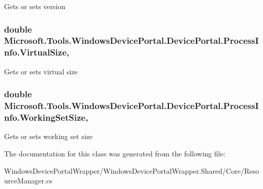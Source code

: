 Gets or sets version 

\subsubsection[{\texorpdfstring{Virtual\+Size}{VirtualSize}}]{\setlength{\rightskip}{0pt plus 5cm}double Microsoft.\+Tools.\+Windows\+Device\+Portal.\+Device\+Portal.\+Process\+Info.\+Virtual\+Size\hspace{0.3cm}{\ttfamily [get]}, {\ttfamily [set]}}\hypertarget{class_microsoft_1_1_tools_1_1_windows_device_portal_1_1_device_portal_1_1_process_info_aec3d7ee9312e1ac9a688131f11de9f89}{}\label{class_microsoft_1_1_tools_1_1_windows_device_portal_1_1_device_portal_1_1_process_info_aec3d7ee9312e1ac9a688131f11de9f89}


Gets or sets virtual size 

\subsubsection[{\texorpdfstring{Working\+Set\+Size}{WorkingSetSize}}]{\setlength{\rightskip}{0pt plus 5cm}double Microsoft.\+Tools.\+Windows\+Device\+Portal.\+Device\+Portal.\+Process\+Info.\+Working\+Set\+Size\hspace{0.3cm}{\ttfamily [get]}, {\ttfamily [set]}}\hypertarget{class_microsoft_1_1_tools_1_1_windows_device_portal_1_1_device_portal_1_1_process_info_aa6dc14262e82afe975924fa7ab9ea6dd}{}\label{class_microsoft_1_1_tools_1_1_windows_device_portal_1_1_device_portal_1_1_process_info_aa6dc14262e82afe975924fa7ab9ea6dd}


Gets or sets working set size 



The documentation for this class was generated from the following file\+:\begin{DoxyCompactItemize}
\item 
Windows\+Device\+Portal\+Wrapper/\+Windows\+Device\+Portal\+Wrapper.\+Shared/\+Core/Resource\+Manager.\+cs\end{DoxyCompactItemize}
